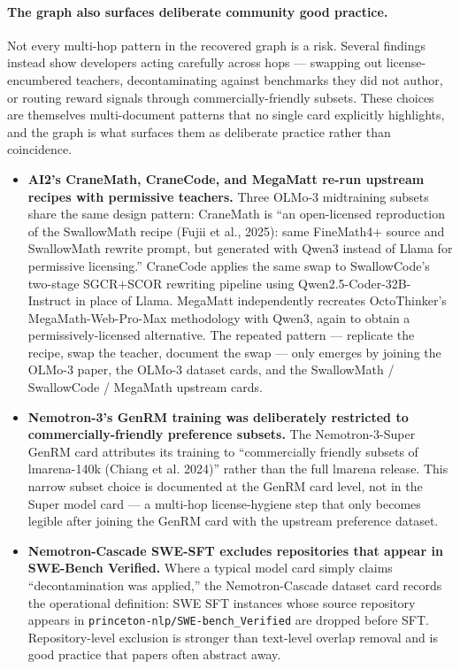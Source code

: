\paragraph{The graph also surfaces deliberate community good practice.}

Not every multi-hop pattern in the recovered graph is a risk. Several findings instead show developers acting carefully across hops --- swapping out license-encumbered teachers, decontaminating against benchmarks they did not author, or routing reward signals through commercially-friendly subsets. These choices are themselves multi-document patterns that no single card explicitly highlights, and the graph is what surfaces them as deliberate practice rather than coincidence.

\begin{itemize}
    \item \textbf{AI2's CraneMath, CraneCode, and MegaMatt re-run upstream recipes with permissive teachers.}
    Three OLMo-3 midtraining subsets share the same design pattern: CraneMath is ``an open-licensed reproduction of the SwallowMath recipe (Fujii et al., 2025): same FineMath4+ source and SwallowMath rewrite prompt, but generated with Qwen3 instead of Llama for permissive licensing.'' CraneCode applies the same swap to SwallowCode's two-stage SGCR$+$SCOR rewriting pipeline using Qwen2.5-Coder-32B-Instruct in place of Llama. MegaMatt independently recreates OctoThinker's MegaMath-Web-Pro-Max methodology with Qwen3, again to obtain a permissively-licensed alternative. The repeated pattern --- replicate the recipe, swap the teacher, document the swap --- only emerges by joining the OLMo-3 paper, the OLMo-3 dataset cards, and the SwallowMath / SwallowCode / MegaMath upstream cards.

    \item \textbf{Nemotron-3's GenRM training was deliberately restricted to commercially-friendly preference subsets.}
    The Nemotron-3-Super GenRM card attributes its training to ``commercially friendly subsets of lmarena-140k (Chiang et al. 2024)'' rather than the full lmarena release. This narrow subset choice is documented at the GenRM card level, not in the Super model card --- a multi-hop license-hygiene step that only becomes legible after joining the GenRM card with the upstream preference dataset.

    \item \textbf{Nemotron-Cascade SWE-SFT excludes repositories that appear in SWE-Bench Verified.}
    Where a typical model card simply claims ``decontamination was applied,'' the Nemotron-Cascade dataset card records the operational definition: SWE SFT instances whose source repository appears in \texttt{princeton-nlp/SWE-bench\_Verified} are dropped before SFT. Repository-level exclusion is stronger than text-level overlap removal and is good practice that papers often abstract away.


\end{itemize}
